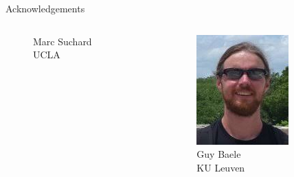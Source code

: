 \documentclass[newPxFont,numfooter,sectionpages]{beamer}
\begin{document}
\begin{frame}{Acknowledgements}
\begin{columns}
\begin{column}{0.3\textwidth}
\begin{figure}
     Marc Suchard \\
     UCLA
     \end{figure}
\end{column}
\begin{column}{0.3\textwidth}  %
    \begin{figure}
     \includegraphics[width=\textwidth]{figures/baele.png} \\
     Guy Baele \\
     KU Leuven
     \end{figure}
\end{column}
\end{columns}
\end{frame}
\end{document}

